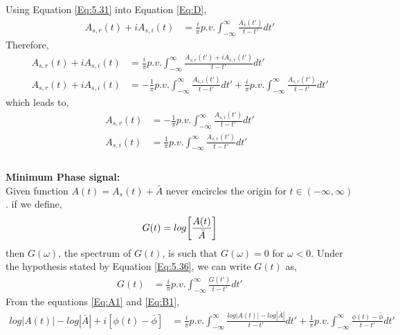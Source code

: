 Using Equation \ref{Eq:5.31} into Equation \ref{Eq:D},
\begin{equation}
\begin{split}
A_{s,r}(t)+iA_{s,i}(t) &=\frac{i}{\pi} p.v. \int_{-\infty}^{\infty} \frac{A_s(t')}{t-t'} dt' 
\end{split}
\label{Eq:5.36}
\end{equation}
Therefore,
\begin{equation}
\begin{split}
A_{s,r}(t)+iA_{s,i}(t) &=\frac{i}{\pi} p.v. \int_{-\infty}^{\infty} \frac{A_{s,r}(t')+iA_{s,r}(t')}{t-t'} dt' \\
A_{s,r}(t)+iA_{s,i}(t)&=-\frac{1}{\pi} p.v. \int_{-\infty}^{\infty} \frac{A_{s,i}(t')}{t-t'} dt' + \frac{i}{\pi} p.v. \int_{-\infty}^{\infty} \frac{A_{s,r}(t')}{t-t'} dt'
\end{split}
\label{Eq:5.37}
\end{equation}
which leads to,
\begin{equation}
\begin{split}
A_{s,r}(t) &=-\frac{1}{\pi} p.v. \int_{-\infty}^{\infty} \frac{A_{s,i}(t')}{t-t'} dt' \\
A_{s,i}(t) &=\frac{1}{\pi} p.v. \int_{-\infty}^{\infty} \frac{A_{s,r}(t')}{t-t'} dt' \\
\end{split}
\label{Eq:5.38}
\end{equation}\\
\textbf{Minimum Phase signal:}\\
Given function $A(t)=A_{s}(t)+\bar{A}$ never encircles the origin for $t\in(-\infty,\infty)$. if we define,
\begin{equation}
G(t)=log\bigg[\dfrac{A(t)}{\bar{A}}\bigg]\\
\label{Eq:A1}
\end{equation} 
then $G(\omega)$, the spectrum of $G(t)$, is such that $G(\omega)=0$ for $\omega<0$. Under the hypothesis stated by Equation \ref{Eq:5.36}, we can write $G(t)$ as,
\begin{equation}
\begin{split}
G(t) &=\frac{i}{\pi} p.v. \int_{-\infty}^{\infty} \frac{G(t')}{t-t'} dt' 
\end{split}
\label{Eq:B1}
\end{equation}
From the equations \ref{Eq:A1} and \ref{Eq:B1},
\begin{equation}
\begin{split}
log|A(t)|-log|\bar{A}|+i[\phi(t)-\bar{\phi}] &=\frac{i}{\pi} p.v. \int_{-\infty}^{\infty} \frac{log|A(t)|-log|\bar{A}|}{t-t'} dt' + \frac{1}{\pi} p.v. \int_{-\infty}^{\infty} \frac{\phi(t)-\bar{\phi}}{t-t'} dt' 
\end{split}
\label{Eq:C1}
\end{equation}

